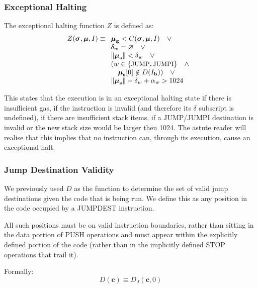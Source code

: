 \documentclass[9pt,oneside]{amsart}
\begin{document}
\begin{multicols}{2}
\subsubsection{Exceptional Halting}

The exceptional halting function $Z$ is defined as:
\begin{equation}
Z(\boldsymbol{\sigma}, \boldsymbol{\mu}, I) \equiv
\begin{array}[t]{l}
\boldsymbol{\mu}_\mathbf{g} < C(\boldsymbol{\sigma}, \boldsymbol{\mu}, I) \quad \vee \\
\mathbf{\delta}_w = \varnothing \quad \vee \\
\lVert\boldsymbol{\mu}_\mathbf{s}\rVert < \mathbf{\delta}_w \quad \vee \\
( w \in \{ \text{\small JUMP}, \text{\small JUMPI} \} \quad \wedge \\ \quad \boldsymbol{\mu}_\mathbf{s}[0] \notin D(I_\mathbf{b}) ) \quad \vee \\
\lVert\boldsymbol{\mu}_\mathbf{s}\rVert - \mathbf{\delta}_w + \mathbf{\alpha}_w > 1024 \quad
\end{array}
\end{equation}

This states that the execution is in an exceptional halting state if there is insufficient gas, if the instruction is invalid (and therefore its $\delta$ subscript is undefined), if there are insufficient stack items, if a {\small JUMP}/{\small JUMPI} destination is invalid or the new stack size would be larger then 1024. The astute reader will realise that this implies that no instruction can, through its execution, cause an exceptional halt.

\subsubsection{Jump Destination Validity}

We previously used $D$ as the function to determine the set of valid jump destinations given the code that is being run. We define this as any position in the code occupied by a {\small JUMPDEST} instruction.

All such positions must be on valid instruction boundaries, rather than sitting in the data portion of {\small PUSH} operations and must appear within the explicitly defined portion of the code (rather than in the implicitly defined {\small STOP} operations that trail it).

Formally:
\begin{equation}
D(\mathbf{c}) \equiv D_J(\mathbf{c}, 0)
\end{equation}


\end{multicols}
\end{document}
